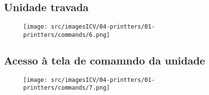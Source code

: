 \newpage
\thispagestyle{fancy}
\vspace{\fill}
\subsection{Unidade travada}
\begin{figure}
    \centering
    \texttt{[image: src/imagesICV/04-printters/01-printters/commands/6.png]}
\end{figure}

\newpage
\thispagestyle{fancy}
\vspace{\fill}
\subsection{Acesso à tela de comamndo da unidade}
\begin{figure}
    \centering
    \texttt{[image: src/imagesICV/04-printters/01-printters/commands/7.png]}
\end{figure}


